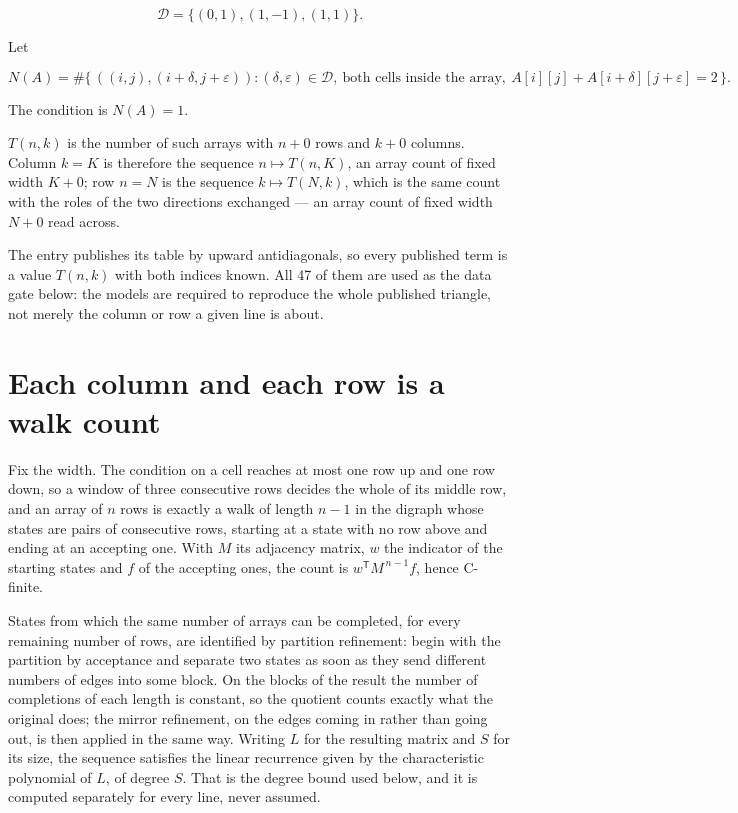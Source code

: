 \documentclass[11pt]{article}
\theoremstyle{definition}
\begin{document}
\[\mathcal{D} = \{(0,1), (1,-1), (1,1)\}.\]

Let

\[N(A) = \#\bigl\{\,((i,j),(i{+}\delta,j{+}\varepsilon)) : (\delta,\varepsilon) \in \mathcal{D},\ \text{both cells inside the array},\ A[i][j] + A[i{+}\delta][j{+}\varepsilon] = 2\,\bigr\}.\]

The condition is $N(A) = 1$.

$T(n,k)$ is the number of such arrays with $n + 0$ rows and $k + 0$ columns. Column $k = K$ is therefore the sequence $n \mapsto T(n,K)$, an array count of fixed width $K + 0$; row $n = N$ is the sequence $k \mapsto T(N,k)$, which is the same count with the roles of the two directions exchanged --- an array count of fixed width $N + 0$ read across.

The entry publishes its table by upward antidiagonals, so every published term is a value $T(n,k)$ with both indices known. All 47 of them are used as the data gate below: the models are required to reproduce the whole published triangle, not merely the column or row a given line is about.

\section{Each column and each row is a walk count}

Fix the width. The condition on a cell reaches at most one row up and one row down, so a window of three consecutive rows decides the whole of its middle row, and an array of $n$ rows is exactly a walk of length $n-1$ in the digraph whose states are pairs of consecutive rows, starting at a state with no row above and ending at an accepting one. With $M$ its adjacency matrix, $w$ the indicator of the starting states and $f$ of the accepting ones, the count is $w^{\mathsf T}M^{\,n-1}f$, hence C-finite.

States from which the same number of arrays can be completed, for every remaining number of rows, are identified by partition refinement: begin with the partition by acceptance and separate two states as soon as they send different numbers of edges into some block. On the blocks of the result the number of completions of each length is constant, so the quotient counts exactly what the original does; the mirror refinement, on the edges coming in rather than going out, is then applied in the same way. Writing $L$ for the resulting matrix and $S$ for its size, the sequence satisfies the linear recurrence given by the characteristic polynomial of $L$, of degree $S$. That is the degree bound used below, and it is computed separately for every line, never assumed.
\end{document}
